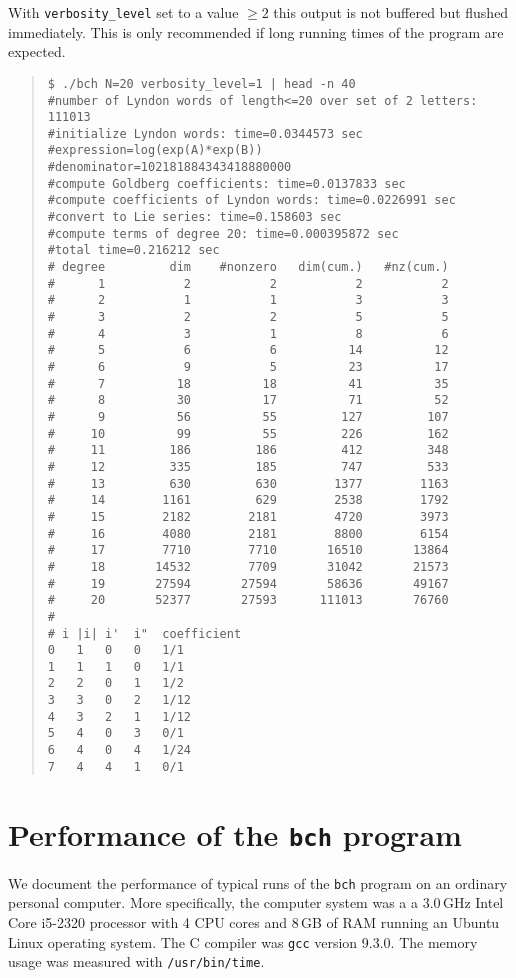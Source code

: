 \documentclass[11pt,a4paper]{article}
\begin{document}
With \verb|verbosity_level| set to a value $\geq 2$ this  output is not buffered but flushed immediately. 
This is only recommended if long running times of the program are expected.

\begin{quote} %
{\small\begin{BVerbatim}
$ ./bch N=20 verbosity_level=1 | head -n 40
#number of Lyndon words of length<=20 over set of 2 letters: 111013
#initialize Lyndon words: time=0.0344573 sec
#expression=log(exp(A)*exp(B))
#denominator=102181884343418880000
#compute Goldberg coefficients: time=0.0137833 sec
#compute coefficients of Lyndon words: time=0.0226991 sec
#convert to Lie series: time=0.158603 sec
#compute terms of degree 20: time=0.000395872 sec
#total time=0.216212 sec
# degree         dim    #nonzero   dim(cum.)   #nz(cum.)
#      1           2           2           2           2
#      2           1           1           3           3
#      3           2           2           5           5
#      4           3           1           8           6
#      5           6           6          14          12
#      6           9           5          23          17
#      7          18          18          41          35
#      8          30          17          71          52
#      9          56          55         127         107
#     10          99          55         226         162
#     11         186         186         412         348
#     12         335         185         747         533
#     13         630         630        1377        1163
#     14        1161         629        2538        1792
#     15        2182        2181        4720        3973
#     16        4080        2181        8800        6154
#     17        7710        7710       16510       13864
#     18       14532        7709       31042       21573
#     19       27594       27594       58636       49167
#     20       52377       27593      111013       76760
#
# i	|i|	i'	i"	coefficient
0	1	0	0	1/1
1	1	1	0	1/1
2	2	0	1	1/2
3	3	0	2	1/12
4	3	2	1	1/12
5	4	0	3	0/1
6	4	0	4	1/24
7	4	4	1	0/1
\end{BVerbatim}
}\end{quote}

\section{Performance of the {\tt bch} program}
We document the performance of typical runs of the \verb|bch|
program on an ordinary personal computer.
More specifically, the computer system was a
a 3.0\,GHz Intel Core i5-2320 processor with 4 CPU cores and
8\,GB of RAM running an Ubuntu Linux operating system. The 
C compiler was \verb|gcc| version 9.3.0.
The memory usage was measured with \verb|/usr/bin/time|.
\end{document}
